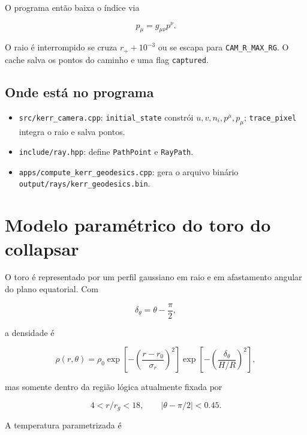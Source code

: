 \documentclass[11pt,a4paper]{article}
\begin{document}
O programa então baixa o índice via

\begin{equation}
  p_\mu = g_{\mu\nu}p^\nu.
\end{equation}

O raio é interrompido se cruza $r_+ + 10^{-3}$ ou se escapa para
\texttt{CAM\_R\_MAX\_RG}. O cache salva os pontos do caminho e uma flag
\texttt{captured}.

\subsection*{Onde está no programa}

\begin{itemize}
  \item \texttt{src/kerr\_camera.cpp}: \texttt{initial\_state} constrói
  $u,v,n_i,p^\mu,p_\mu$; \texttt{trace\_pixel} integra o raio e salva
  pontos.
  \item \texttt{include/ray.hpp}: define \texttt{PathPoint} e
  \texttt{RayPath}.
  \item \texttt{apps/compute\_kerr\_geodesics.cpp}: gera o arquivo binário
  \texttt{output/rays/kerr\_geodesics.bin}.
\end{itemize}

\section{Modelo paramétrico do toro do collapsar}

O toro é representado por um perfil gaussiano em raio e em afastamento
angular do plano equatorial. Com

\begin{equation}
  \delta_\theta = \theta-\frac{\pi}{2},
\end{equation}

a densidade é

\begin{equation}
  \rho(r,\theta) =
  \rho_0
  \exp\left[-\left(\frac{r-r_0}{\sigma_r}\right)^2\right]
  \exp\left[-\left(\frac{\delta_\theta}{H/R}\right)^2\right],
\end{equation}

mas somente dentro da região lógica atualmente fixada por

\begin{equation}
  4 < r/r_g < 18,\qquad |\theta-\pi/2| < 0.45.
\end{equation}

A temperatura parametrizada é
\end{document}

